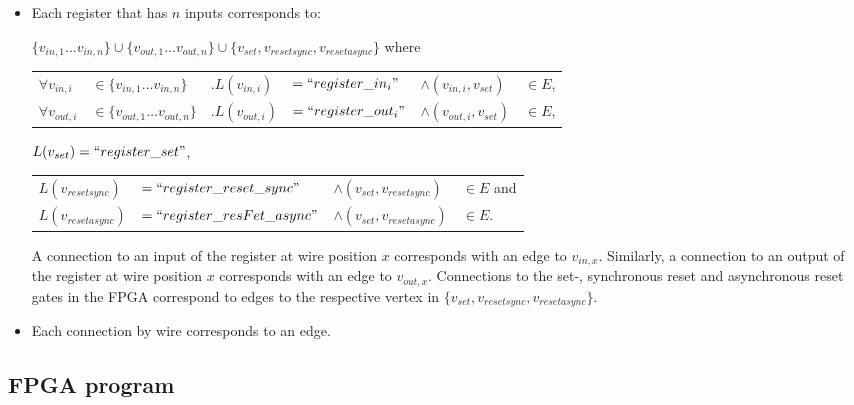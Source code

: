 \begin{itemize}
\item Each register that has $n$ inputs corresponds to:

$\{v_{in, 1} \dots v_{in, n}\} \cup \{v_{out, 1} \dots v_{out, n}\} \cup \{v_{set}, v_{resetsync}, v_{resetasync}\}$ where

\begingroup
\setlength{\tabcolsep}{2pt} %
\begin{tabular}{llllll}
$\forall v_{in, i}$ & $\in \{v_{in, 1} \dots v_{in, n}\}$ & $. L(v_{in, i})$&$=``register\_in_i"$&$\land (v_{in, i}, v_{set})$&$\in E$, \\
$\forall v_{out, i}$ & $\in \{v_{out, 1} \dots v_{out, n}\}$ & $. L(v_{out, i})$&$=``register\_out_i"$&$\land (v_{out, i}, v_{set})$&$\in E$, \\
\end{tabular}
\endgroup

$L(v_{set})=``register\_set"$,

\begingroup
\setlength{\tabcolsep}{2pt} %
\begin{tabular}{llll}
$L(v_{resetsync})$&$=``register\_reset\_sync"$&$\land (v_{set}, v_{resetsync}) $&$\in E$ and\\
$L(v_{resetasync})$&$=``register\_resFet\_async"$&$\land (v_{set}, v_{resetasync}) $&$\in E$.
\end{tabular}
\endgroup

A connection to an input of the register at wire position $x$ corresponds with an edge to $v_{in, x}$. Similarly, a connection to an output of the register at wire position $x$ corresponds with an edge to $v_{out, x}$. Connections to the set-, synchronous reset and asynchronous reset gates in the FPGA correspond to edges to the respective vertex in $\{v_{set}, v_{resetsync}, v_{resetasync}\}$.
 

\item Each connection by wire corresponds to an edge.
\end{itemize}
\subsection{FPGA program}